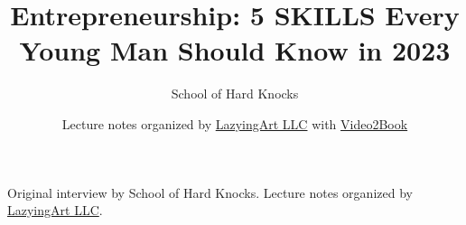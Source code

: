 \documentclass[11pt,oneside]{book}
\begin{document}
\frontmatter
\title{Entrepreneurship: 5 SKILLS Every Young Man Should Know in 2023}
\author{School of Hard Knocks}
\date{Lecture notes organized by \href{https://lazying.art}{LazyingArt LLC} with \href{https://github.com/lachlanchen/Video2Book}{Video2Book}}
\maketitle
\begin{center}
\small Original interview by School of Hard Knocks. Lecture notes organized by \href{https://lazying.art}{LazyingArt LLC}.
\end{center}
\clearpage
\mainmatter

\end{document}
